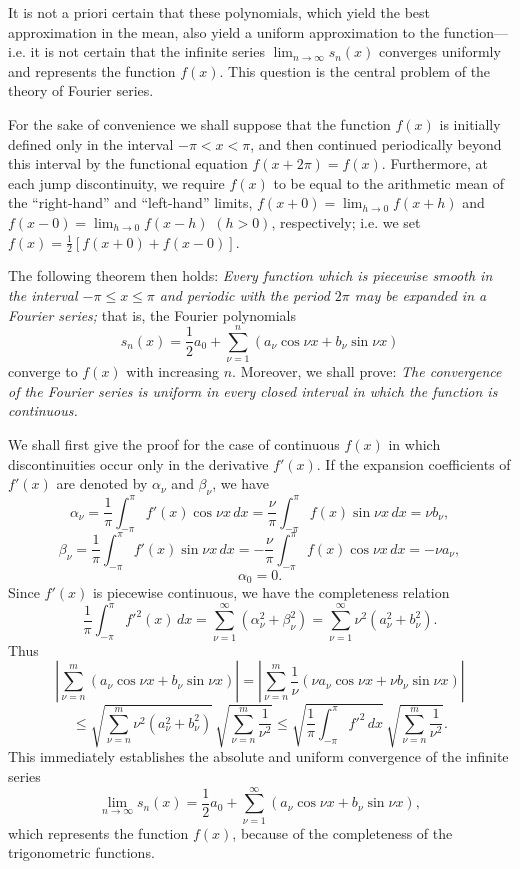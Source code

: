 It is not a priori certain that these polynomials, which yield the best approximation in the mean, also yield a uniform approximation to the function---i.e. it is not certain that the infinite series $\lim_{n\to\infty}s_n(x)$ converges uniformly and represents the function $f(x)$. This question is the central problem of the theory of Fourier series.

For the sake of convenience we shall suppose that the function $f(x)$ is initially defined only in the interval $-\pi<x<\pi$, and then continued periodically beyond this interval by the functional equation $f(x+2\pi)=f(x)$. Furthermore, at each jump discontinuity, we require $f(x)$ to be equal to the arithmetic mean of the ``right-hand'' and ``left-hand'' limits, $f(x+0)=\lim_{h\to0}f(x+h)$ and $f(x-0)=\lim_{h\to0}f(x-h)$ $(h>0)$, respectively; i.e. we set $f(x)=\tfrac12[f(x+0)+f(x-0)]$.

The following theorem then holds: \emph{Every function which is piecewise smooth in the interval $-\pi\le x\le\pi$ and periodic with the period $2\pi$ may be expanded in a Fourier series;} that is, the Fourier polynomials
\[
s_n(x)=\frac12a_0+\sum_{\nu=1}^{n}(a_\nu\cos\nu x+b_\nu\sin\nu x)
\]
converge to $f(x)$ with increasing $n$. Moreover, we shall prove: \emph{The convergence of the Fourier series is uniform in every closed interval in which the function is continuous.}

We shall first give the proof for the case of continuous $f(x)$ in which discontinuities occur only in the derivative $f'(x)$. If the expansion coefficients of $f'(x)$ are denoted by $\alpha_\nu$ and $\beta_\nu$, we have
\[
\alpha_\nu=\frac1\pi\int_{-\pi}^{\pi}f'(x)\cos\nu x\,dx
=\frac{\nu}{\pi}\int_{-\pi}^{\pi}f(x)\sin\nu x\,dx
=\nu b_\nu,
\]
\[
\beta_\nu=\frac1\pi\int_{-\pi}^{\pi}f'(x)\sin\nu x\,dx
=-\frac{\nu}{\pi}\int_{-\pi}^{\pi}f(x)\cos\nu x\,dx
=-\nu a_\nu,
\]
\[
\alpha_0=0.
\]
Since $f'(x)$ is piecewise continuous, we have the completeness relation
\[
\frac1\pi\int_{-\pi}^{\pi}f'^2(x)\,dx
=\sum_{\nu=1}^{\infty}(\alpha_\nu^2+\beta_\nu^2)
=\sum_{\nu=1}^{\infty}\nu^2(a_\nu^2+b_\nu^2).
\]
Thus
\[
\left|\sum_{\nu=n}^{m}(a_\nu\cos\nu x+b_\nu\sin\nu x)\right|
=\left|\sum_{\nu=n}^{m}\frac1\nu(\nu a_\nu\cos\nu x+\nu b_\nu\sin\nu x)\right|
\]
\[
\le\sqrt{\sum_{\nu=n}^{m}\nu^2(a_\nu^2+b_\nu^2)}\,
\sqrt{\sum_{\nu=n}^{m}\frac1{\nu^2}}
\le\sqrt{\frac1\pi\int_{-\pi}^{\pi}f'^2\,dx}\,
\sqrt{\sum_{\nu=n}^{m}\frac1{\nu^2}}.
\]
This immediately establishes the absolute and uniform convergence of the infinite series
\[
\lim_{n\to\infty}s_n(x)=\frac12a_0+\sum_{\nu=1}^{\infty}(a_\nu\cos\nu x+b_\nu\sin\nu x),
\]
which represents the function $f(x)$, because of the completeness of the trigonometric functions.

